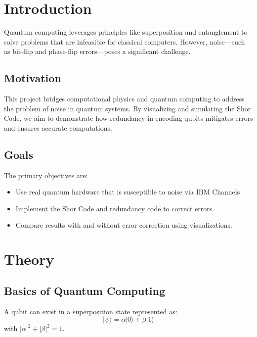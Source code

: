 \documentclass[10pt]{article}
\begin{document}
\begin{multicols}{2}

\section*{Introduction}
Quantum computing leverages principles like superposition and entanglement to solve problems that are infeasible for classical computers. However, noise—such as bit-flip and phase-flip errors—poses a significant challenge.

\subsection*{Motivation}
This project bridges computational physics and quantum computing to address the problem of noise in quantum systems. By visualizing and simulating the Shor Code, we aim to demonstrate how redundancy in encoding qubits mitigates errors and ensures accurate computations.

\subsection*{Goals}
The primary objectives are:
\begin{itemize}
    \item Use real quantum hardware that is susceptible to noise via IBM Channels
    \item Implement the Shor Code and redundancy code to correct errors.
    \item Compare results with and without error correction using visualizations.
\end{itemize}

\section*{Theory}
\subsection*{Basics of Quantum Computing}
A qubit can exist in a superposition state represented as:
\[
|\psi\rangle = \alpha|0\rangle + \beta|1\rangle
\]
with \( |\alpha|^2 + |\beta|^2 = 1 \).


\end{multicols}
\end{document}
